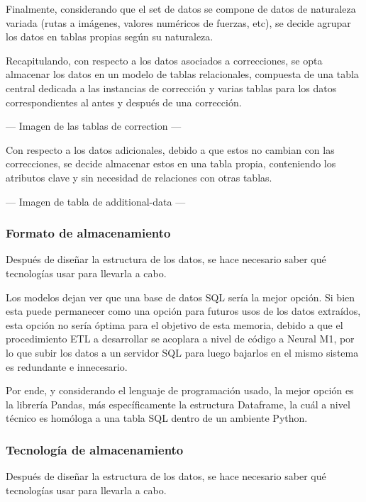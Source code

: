 Finalmente, considerando que el set de datos se compone de datos de naturaleza variada (rutas a imágenes, valores numéricos de fuerzas, etc), se decide agrupar los datos en tablas propias según su naturaleza.

Recapitulando, con respecto a los datos asociados a correcciones, se opta almacenar los datos en un modelo de tablas relacionales, compuesta de una tabla central dedicada a las instancias de corrección y varias tablas para los datos correspondientes al antes y después de una corrección.

--- Imagen de las tablas de correction ---

Con respecto a los datos adicionales, debido a que estos no cambian con las correcciones, se decide almacenar estos en una tabla propia, conteniendo los atributos clave y sin necesidad de relaciones con otras tablas.

--- Imagen de tabla de additional-data ---

\subsubsection{Formato de almacenamiento}

Después de diseñar la estructura de los datos, se hace necesario saber qué tecnologías usar para llevarla a cabo.

Los modelos dejan ver que una base de datos SQL sería la mejor opción. Si bien esta puede permanecer como una opción para futuros usos de los datos extraídos, esta opción no sería óptima para el objetivo de esta memoria, debido a que el procedimiento ETL a desarrollar se acoplara a nivel de código a Neural M1, por lo que subir los datos a un servidor SQL para luego bajarlos en el mismo sistema es redundante e innecesario.

Por ende, y considerando el lenguaje de programación usado, la mejor opción es la librería Pandas, más específicamente la estructura Dataframe, la cuál a nivel técnico es homóloga a una tabla SQL dentro de un ambiente Python.

\subsubsection{Tecnología de almacenamiento}

Después de diseñar la estructura de los datos, se hace necesario saber qué tecnologías usar para llevarla a cabo.

